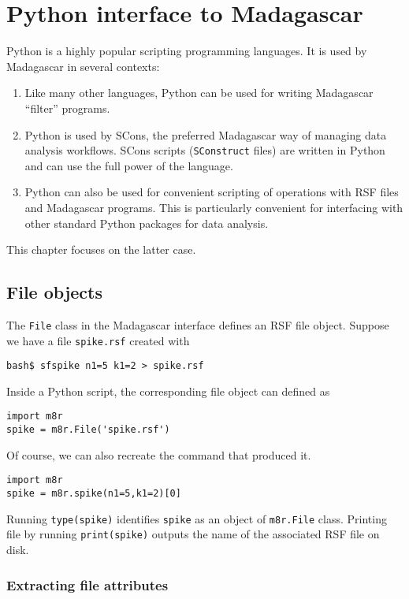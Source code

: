 \chapter{Python interface to Madagascar}

Python is a highly popular scripting programming languages. It is used by Madagascar in several contexts:
\begin{enumerate}
\item Like many other languages, Python can be used for writing Madagascar ``filter'' programs.
\item Python is used by SCons, the preferred Madagascar way of
  managing data analysis workflows. SCons scripts (\texttt{SConstruct}
  files) are written in Python and can use the full power of the
  language.
\item Python can also be used for convenient scripting of operations
  with RSF files and Madagascar programs. This is particularly
  convenient for interfacing with other standard Python packages for
  data analysis.
\end{enumerate}
This chapter focuses on the latter case.

\section{File objects}
\lstset{language=python,numbers=left,numberstyle=\tiny,showstringspaces=false}

The \texttt{File} class in the Madagascar interface defines an RSF file object. Suppose we have a file \texttt{spike.rsf} created with
\begin{verbatim}
bash$ sfspike n1=5 k1=2 > spike.rsf
\end{verbatim}
Inside a Python script, the corresponding file object can defined as
\begin{lstlisting}
import m8r
spike = m8r.File('spike.rsf')  
\end{lstlisting}
Of course, we can also recreate the command that produced it.
\begin{lstlisting}
import m8r
spike = m8r.spike(n1=5,k1=2)[0]
\end{lstlisting}
Running \texttt{type(spike)} identifies \texttt{spike} as an object of
\texttt{m8r.File} class. Printing file by running
\texttt{print(spike)} outputs the name of the associated RSF file
on disk.

\subsection{Extracting file attributes}

